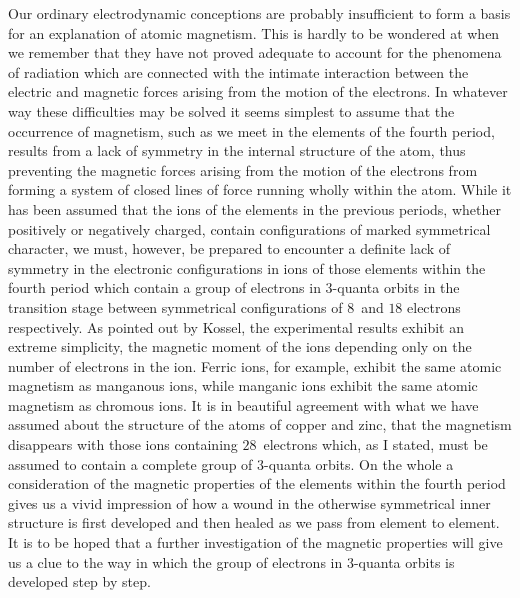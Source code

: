 Our ordinary electrodynamic conceptions are probably insufficient
to form a basis for an explanation of atomic magnetism. This is
hardly to be wondered at when we remember that they have not
proved adequate to account for the phenomena of radiation which
are connected with the intimate interaction between the electric
and magnetic forces arising from the motion of the electrons. In
whatever way these difficulties may be solved it seems simplest to
assume that the occurrence of magnetism, such as we meet in the
elements of the fourth period, results from a lack of symmetry in
the internal structure of the atom, thus preventing the magnetic
forces arising from the motion of the electrons from forming a
system of closed lines of force running wholly within the atom.
While it has been assumed that the ions of the elements in the
previous periods, whether positively or negatively charged, contain
configurations of marked symmetrical character, we must, however,
be prepared to encounter a definite lack of symmetry in the
electronic configurations in ions of those elements within the fourth
period which contain a group of electrons in $3$-quanta orbits in the
transition stage between symmetrical configurations of $8$~and $18$
electrons respectively. As pointed out by Kossel, the experimental
results exhibit an extreme simplicity, the magnetic moment of the
ions depending only on the number of electrons in the ion. Ferric
ions, for example, exhibit the same atomic magnetism as manganous
ions, while manganic ions exhibit the same atomic magnetism as
chromous ions. It is in beautiful agreement with what we have
assumed about the structure of the atoms of copper and zinc, that
the magnetism disappears with those ions containing $28$~electrons
which, as I stated, must be assumed to contain a complete group
of $3$-quanta orbits. On the whole a consideration of the magnetic
properties of the elements within the fourth period gives us a vivid
impression of how a wound in the otherwise symmetrical inner
structure is first developed and then healed as we pass from element
to element. It is to be hoped that a further investigation of the
magnetic properties will give us a clue to the way in which the
group of electrons in $3$-quanta orbits is developed step by step.

